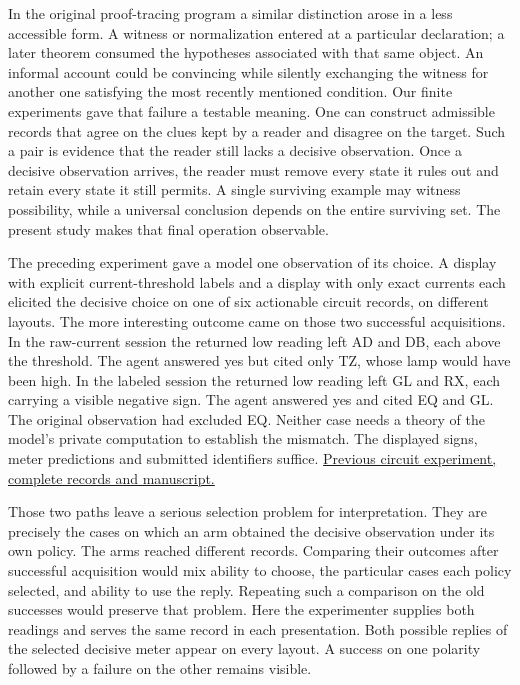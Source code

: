 \documentclass[12pt,letterpaper]{article}
\begin{document}
In the original proof-tracing program a similar distinction arose in a less accessible form. A witness or normalization entered at a particular declaration; a later theorem consumed the hypotheses associated with that same object. An informal account could be convincing while silently exchanging the witness for another one satisfying the most recently mentioned condition. Our finite experiments gave that failure a testable meaning. One can construct admissible records that agree on the clues kept by a reader and disagree on the target. Such a pair is evidence that the reader still lacks a decisive observation. Once a decisive observation arrives, the reader must remove every state it rules out and retain every state it still permits. A single surviving example may witness possibility, while a universal conclusion depends on the entire surviving set. The present study makes that final operation observable.

The preceding experiment gave a model one observation of its choice. A display with explicit current-threshold labels and a display with only exact currents each elicited the decisive choice on one of six actionable circuit records, on different layouts. The more interesting outcome came on those two successful acquisitions. In the raw-current session the returned low reading left AD and DB, each above the threshold. The agent answered yes but cited only TZ, whose lamp would have been high. In the labeled session the returned low reading left GL and RX, each carrying a visible negative sign. The agent answered yes and cited EQ and GL. The original observation had excluded EQ. Neither case needs a theory of the model's private computation to establish the mismatch. The displayed signs, meter predictions and submitted identifiers suffice. \href{https://github.com/nousentllc/riemann-hypothesis/tree/90729bccc20c8f941bb79494861702259bcaddbb/research/uriel/experiments/circuit-threshold-diagnostic}{Previous circuit experiment, complete records and manuscript.}

Those two paths leave a serious selection problem for interpretation. They are precisely the cases on which an arm obtained the decisive observation under its own policy. The arms reached different records. Comparing their outcomes after successful acquisition would mix ability to choose, the particular cases each policy selected, and ability to use the reply. Repeating such a comparison on the old successes would preserve that problem. Here the experimenter supplies both readings and serves the same record in each presentation. Both possible replies of the selected decisive meter appear on every layout. A success on one polarity followed by a failure on the other remains visible.
\end{document}
